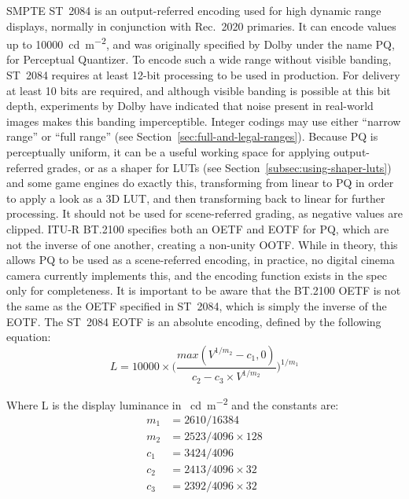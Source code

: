 SMPTE ST~2084 \parencite{SocietyofMotionPictureandTelevisionEngineers2014a} is an output-referred encoding used for high dynamic range displays, normally in conjunction with Rec.~2020 primaries.
It can encode values up to \SI{10000}{\candela\per\metre\squared}, and was originally specified by Dolby under the name PQ, for Perceptual Quantizer.
To encode such a wide range without visible banding, ST~2084 requires at least 12-bit processing to be used in production.
For delivery at least 10 bits are required, and although visible banding is possible at this bit depth, experiments by Dolby have indicated that noise present in real-world images makes this banding imperceptible.
Integer codings may use either ``narrow range'' or ``full range'' (see Section~\ref{sec:full-and-legal-ranges}).
\ccPar{}
Because PQ is perceptually uniform, it can be a useful working space for applying output-referred grades, or as a shaper for LUTs (see Section~\ref{subsec:using-shaper-luts}) and some game engines do exactly this, transforming from linear to PQ in order to apply a look as a 3D LUT, and then transforming back to linear for further processing.
It should not be used for scene-referred grading, as negative values are clipped.
\ccPar{}
ITU-R BT.2100 \parencite{InternationalTelecommunicationUnion2016a} specifies both an OETF and EOTF for PQ, which are not the inverse of one another, creating a non-unity OOTF.
While in theory, this allows PQ to be used as a scene-referred encoding, in practice, no digital cinema camera currently implements this, and the encoding function exists in the spec only for completeness.
It is important to be aware that the BT.2100 OETF is not the same as the OETF specified in ST~2084, which is simply the inverse of the EOTF.
\ccPar{}
The ST~2084 EOTF is an absolute encoding, defined by the following equation:
\begin{equation}
    L = 10000 \times \bigg(\frac{max(V^{1/m_2} - c_1, 0)}{c_2 - c_3 \times V^{1/m_2}}\bigg)^{1/m_1}
\end{equation}

Where L is the display luminance in \SI{}{\candela\per\metre\squared} and the constants are:
\begin{align}
    m_1 &= 2610 / 16384 \nonumber \\
    m_2 &= 2523 / 4096 \times 128 \nonumber \\
    c_1 &= 3424 / 4096 \nonumber \\
    c_2 &= 2413 / 4096 \times 32 \nonumber \\
    c_3 &= 2392 / 4096 \times 32 \nonumber
\end{align}

